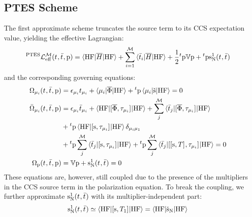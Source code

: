 \subsection*{PTES Scheme}


The first approximate scheme truncates the source term to its \acrshort{CCS}
expectation value, yielding the effective Lagrangian:
\begin{equation}\label{eq:ptes-cc}
  {}^{\mathrm{PTES}}\mathcal{L}^\mathcal{M}_\mathrm{eff}(t_{}, \bar{t}_{}, \mathrm{p}) =
  \braket{\mathrm{HF} | \overline{H} | \mathrm{HF}}
  + \sum_{i=1}^{\mathcal{M}}\braket{\bar{t}_{i} | \overline{H} | \mathrm{HF}}
  + \frac{1}{2}{}^t\mathrm{p}\mathbb{V}\mathrm{p} + {}^t\mathrm{p}\mathrm{s}_{\mathrm{N}}^1(t_{}, \bar{t}_{})
\end{equation}
and the corresponding governing equations:
\begin{subequations}
  \begin{align}
   \Omega_{\mu_i}(t_{}, \bar{t}_{}, \mathrm{p})  &=
   \epsilon_{\mu_i}t_{\mu_i} + \braket{\mu_i | \overline{\Phi} | \mathrm{HF}}
   + {}^t\mathrm{p}\braket{\mu_i | \check{\mathrm{s}} | \mathrm{HF}}
             = 0 \\
   \bar{\Omega}_{\mu_i}(t_{}, \bar{t}_{}, \mathrm{p})
    &=
    \epsilon_{\mu_i}\bar{t}_{\mu_i} +
    \braket{\mathrm{HF} | [ \overline{\Phi}, \tau_{\mu_i} ]^{} | \mathrm{HF}} +
    \sum_{j}^{\mathcal{M}}\braket{\bar{t}_{j} |
    [ \overline{\Phi}, \tau_{\mu_i} ]^{} | \mathrm{HF}}
    \nonumber \\
    &+
    {}^t\mathrm{p}\braket{\mathrm{HF} | [ \mathrm{s}, \tau_{\mu_i} ]^{} | \mathrm{HF}}\delta_{\mu_i\mu_1} \nonumber \\
    &+
    {}^t\mathrm{p}\sum_{j}^{\mathcal{M}}\braket{\bar{t}_{j} | [ \mathrm{s}, \tau_{\mu_i} ]^{} | \mathrm{HF}}
    +
    {}^t\mathrm{p}\sum_{j}^{\mathcal{M}}\braket{\bar{t}_{j} | [ [ \mathrm{s}, T ]^{}, \tau_{\mu_i} ]^{} | \mathrm{HF}}
             = 0 \\
    \Omega_{\mathrm{p}}(t_{}, \bar{t}_{}, \mathrm{p})
    &=
    \mathbb{V}\mathrm{p} + \mathrm{s}_{\mathrm{N}}^1(t_{}, \bar{t}_{}) = 0
  \end{align}
\end{subequations}
These equations are, however, still coupled due to the presence of the
multipliers in the \acrshort{CCS} source term in the polarization equation.
To break the coupling, we further approximate $\mathrm{s}_{\mathrm{N}}^1(t_{}, \bar{t}_{})$
with its multiplier-independent part:
\begin{equation}
  \mathrm{s}_{\mathrm{N}}^1(t_{}, \bar{t}_{})
  \simeq
  \braket{\mathrm{HF} | [ \mathrm{s}, T_1 ]^{} | \mathrm{HF}}
  =
  \braket{\mathrm{HF} | \check{\mathrm{s}}_{\mathrm{N}} | \mathrm{HF}}
\end{equation}
